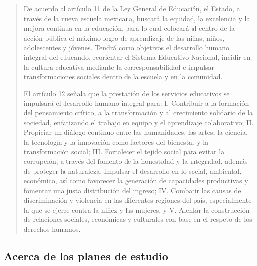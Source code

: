\documentclass[
  12,
]{scrartcl}
\begin{document}
\begin{quote}
De acuerdo al artículo 11 de la Ley General de Educación, el Estado, a
través de la nueva escuela mexicana, buscará la equidad, la excelencia y
la mejora continua en la educación, para lo cual colocará al centro de
la acción pública el máximo logro de aprendizaje de las niñas, niños,
adolescentes y jóvenes. Tendrá como objetivos el desarrollo humano
integral del educando, reorientar el Sistema Educativo Nacional, incidir
en la cultura educativa mediante la corresponsabilidad e impulsar
transformaciones sociales dentro de la escuela y en la comunidad.

El artículo 12 señala que la prestación de los servicios educativos se
impulsará el desarrollo humano integral para: I. Contribuir a la
formación del pensamiento crítico, a la transformación y al crecimiento
solidario de la sociedad, enfatizando el trabajo en equipo y el
aprendizaje colaborativo; II. Propiciar un diálogo continuo entre las
humanidades, las artes, la ciencia, la tecnología y la innovación como
factores del bienestar y la transformación social; III. Fortalecer el
tejido social para evitar la corrupción, a través del fomento de la
honestidad y la integridad, además de proteger la naturaleza, impulsar
el desarrollo en lo social, ambiental, económico, así como favorecer la
generación de capacidades productivas y fomentar una justa distribución
del ingreso; IV. Combatir las causas de discriminación y violencia en
las diferentes regiones del país, especialmente la que se ejerce contra
la niñez y las mujeres, y V. Alentar la construcción de relaciones
sociales, económicas y culturales con base en el respeto de los derechos
humanos.
\end{quote}

\hypertarget{acerca-de-los-planes-de-estudio}{%
\subsection{Acerca de los planes de
estudio}\label{acerca-de-los-planes-de-estudio}}
\end{document}
